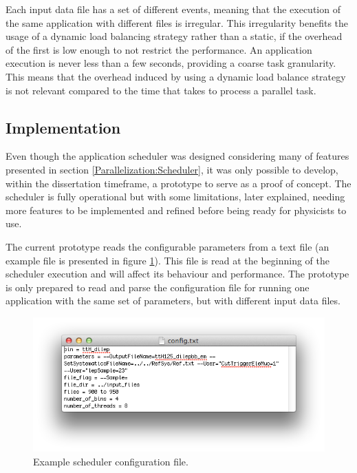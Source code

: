 Each input data file has a set of different events, meaning that the execution of the same application with different files is irregular. This irregularity benefits the usage of a dynamic load balancing strategy rather than a static, if the overhead of the first is low enough to not restrict the performance. An application execution is never less than a few seconds, providing a coarse task granularity. This means that the overhead induced by using a dynamic load balance strategy is not relevant compared to the time that takes to process a parallel task.

\subsection{Implementation}
\label{SchedulerImplementation}

Even though the application scheduler was designed considering many of features presented in section \ref{Parallelization:Scheduler}, it was only possible to develop, within the dissertation timeframe, a prototype to serve as a proof of concept. The scheduler is fully operational but with some limitations, later explained, needing more features to be implemented and refined before being ready for physicists to use.

The current prototype reads the configurable parameters from a text file (an example file is presented in figure \ref{fig:SchedulerFile}). This file is read at the beginning of the scheduler execution and will affect its behaviour and performance. The prototype is only prepared to read and parse the configuration file for running one application with the same set of parameters, but with different input data files.

\begin{figure}[!htp]
	\begin{center}
		\includegraphics[scale=0.8]{../../common/img/scheduler_config.png}
		\caption{Example scheduler configuration file.}
		\label{fig:SchedulerFile}
	\end{center}
\end{figure}


